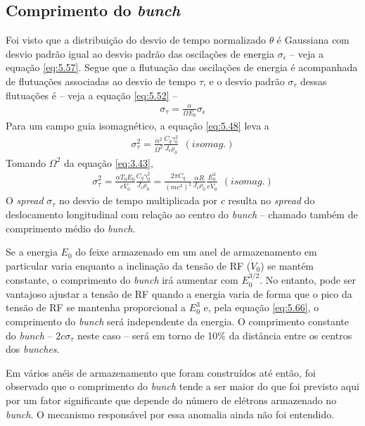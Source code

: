 \subsection{Comprimento do \textit{bunch}}\label{sec:5.4}
Foi visto que a distribuição do desvio de tempo normalizado $\theta$ é Gaussiana com desvio padrão igual ao desvio padrão das oscilações de energia $\sigma_\epsilon$ -- veja a equação \eqref{eq:5.57}. Segue que a flutuação das oscilações de energia é acompanhada de flutuações associadas ao desvio de tempo $\tau$, e o desvio padrão $\sigma_\tau$ dessas flutuações é -- veja a equação \eqref{eq:5.52} --
\begin{align}
	\sigma_\tau = \frac{\alpha}{\Omega E_0}\sigma_\epsilon
\end{align}
Para um campo guia isomagnético, a equação \eqref{eq:5.48} leva a
\begin{align}
	\sigma_\tau^2 = \frac{\alpha^2}{\Omega^2} \frac{C_q \gamma_0^2}{J_\epsilon \rho_0}\ \ (isomag.)
\end{align}
Tomando $\Omega^2$ da equação \eqref{eq:3.43},
\begin{align}
	\sigma_\tau^2 = \frac{\alpha T_0 E_0}{e \dot{V}_0}\frac{C_q \gamma_0^2}{J_\epsilon \rho_0} = \frac{2\pi C_q}{(mc^2)^2}\frac{\alpha R}{J_\epsilon \rho_0}\frac{E_0^3}{e \dot{V}_0}\ \ (isomag.)\label{eq:5.66}
\end{align}
O \textit{spread} $\sigma_\tau$ no desvio de tempo multiplicada por $c$ resulta no \textit{spread} do deslocamento longitudinal com relação ao centro do \textit{bunch} -- chamado também de comprimento médio do \textit{bunch}.

Se a energia $E_0$ do feixe armazenado em um anel de armazenamento em particular varia enquanto a inclinação da tensão de RF ($\dot{V}_0$) se mantém constante, o comprimento do \textit{bunch} irá aumentar com $E_0^{3/2}$. No entanto, pode ser vantajoso ajustar a tensão de RF quando a energia varia de forma que o pico da tensão de RF se mantenha proporcional a $E_0^3$ e, pela equação \eqref{eq:5.66}, o comprimento do \textit{bunch} será independente da energia. O comprimento constante do \textit{bunch} -- $2c\sigma_\tau$ neste caso -- será em torno de 10\% da distância entre os centros dos \textit{bunches}.

Em vários anéis de armazenamento que foram construídos até então, foi observado que o comprimento do \textit{bunch} tende a ser maior do que foi previsto aqui por um fator significante que depende do número de elétrons armazenado no \textit{bunch}. O mecanismo responsável por essa anomalia ainda não foi entendido.